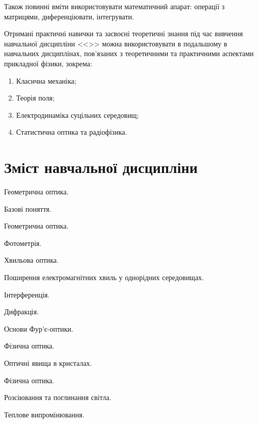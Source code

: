 \documentclass{Syllabus}
\begin{document}
Також повинні вміти використовувати математичний апарат: операції з матрицями,  диференціювати, інтегрувати.

Отримані практичні навички та засвоєні теоретичні знання під час вивчення навчальної дисципліни <<\discipline>> можна використовувати в подальшому в навчальних дисциплінах, пов’язаних з теоретичними та практичними аспектами прикладної фізики, зокрема:

\begin{enumerate}
    \item Класична механіка;
    \item Теорія поля;
    \item Електродинаміка суцільних середовищ;
    \item Статистична оптика та радіофізика.
\end{enumerate}


\section{Зміст навчальної дисципліни}


\begin{Rozdil}
\item Геометрична оптика.
    \begin{Rozdil}
        \item Базові поняття.
        \item Геометрична оптика.
        \item Фотометрія.
    \end{Rozdil}
\item Хвильова оптика.
    \begin{Rozdil}
        \item Поширення електромагнітних хвиль у однорідних середовищах.
        \item Інтерференція.
        \item Дифракція.
        \item Основи Фур’є-оптики.
    \end{Rozdil}
\item Фізична оптика.
    \begin{Rozdil}
        \item Оптичні явища в кристалах.
        \item Фізична оптика.
        \item Розсіювання та поглинання світла.
        \item Теплове випромінювання.
    \end{Rozdil}
\end{Rozdil}
\end{document}
